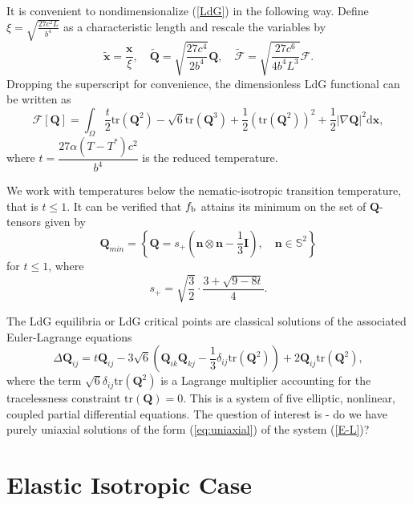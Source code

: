 \documentclass[10pt, a4paper]{article}
\newcommand\dd{\mathrm{d}}
\newcommand\n{\mathbf{n}}
\newcommand\x{\mathbf{x}}
\newcommand\Qvec{\mathbf{Q}}
\newcommand\tr{\mathrm{tr}}
\begin{document}
It is convenient to nondimensionalize (\ref{LdG}) in the following way. Define $\xi = \sqrt{\frac{27 c^2 L}{b^4}}$ as a characteristic length and rescale the variables by \cite{henaomajumdarpisante2017}
\begin{equation}
\tilde{\x} = \frac{\x}{\xi}, \quad \tilde{\Qvec} = \sqrt{\frac{27 c^4}{2 b^4}} \Qvec, \quad \tilde{\mathcal{F}} = \sqrt{\frac{27 c^6}{4b^4L^3}} \mathcal{F}.
\end{equation} 
Dropping the superscript for convenience,  the dimensionless LdG functional can be written as
\begin{equation}\label{eq_dimless}
\mathcal{F}[\Qvec] = \int_{\Omega} \frac{t}{2} \tr(\Qvec^2) - \sqrt{6} \tr(\Qvec^3) + \frac{1}{2} (\tr(\Qvec^2))^2
+ \frac{1}{2} |\nabla \Qvec|^2 \dd \mathbf{x},
\end{equation}
where $t = \dfrac{27 \alpha(T - T^{*}) c^2}{b^4}$ is the reduced temperature. 

We work with temperatures below the nematic-isotropic transition temperature, that is $t \leq 1$. It can be verified that $f_{\rm b}$ attains its minimum on the set of $\Qvec$-tensors given by \cite{majumdar2010equilibrium}
\begin{equation}
\Qvec_{min} = \left\{ \Qvec = s_{+} (\n \otimes \n - \frac{1}{3} \mathbf{I}), \quad \n \in \mathbb{S}^2 \right\}
\end{equation}
for $t \leq 1$, where
\begin{equation}
s_{+} = \sqrt{\frac{3}{2}} \cdot \frac{3  + \sqrt{9 - 8t}}{4}. 
\end{equation}

The LdG equilibria or LdG critical points are classical solutions of the associated Euler-Lagrange equations \cite{amaz}
\begin{equation}\label{E-L}
\Delta \Qvec_{ij} = t \Qvec_{ij} - 3 \sqrt{6} \left( \Qvec_{ik}\Qvec_{kj} - \frac{1}{3} \delta_{ij} \tr(\Qvec^2) \right) + 2 \Qvec_{ij} \tr(\Qvec^2),
\end{equation}
where the term $\sqrt{6} \delta_{ij} \tr(\Qvec^2)$ is a Lagrange multiplier accounting for the tracelessness constraint $\tr(\Qvec) = 0$. This is a system of five elliptic, nonlinear, coupled partial differential equations.
The question of interest is - do we have purely uniaxial solutions of the form (\ref{eq:uniaxial}) of the system (\ref{E-L})?

\section{Elastic Isotropic Case}
\end{document}
